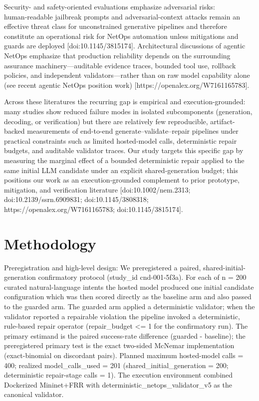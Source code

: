 \documentclass[conference]{IEEEtran}
\begin{document}
Security- and safety-oriented evaluations emphasize adversarial risks: human‑readable jailbreak prompts and adversarial-context attacks remain an effective threat class for unconstrained generative pipelines and therefore constitute an operational risk for NetOps automation unless mitigations and guards are deployed [doi:10.1145/3815174]. Architectural discussions of agentic NetOps emphasize that production reliability depends on the surrounding assurance machinery---auditable evidence traces, bounded tool use, rollback policies, and independent validators---rather than on raw model capability alone (see recent agentic NetOps position work) [https://openalex.org/W7161165783].

Across these literatures the recurring gap is empirical and execution-grounded: many studies show reduced failure modes in isolated subcomponents (generation, decoding, or verification) but there are relatively few reproducible, artifact-backed measurements of end-to-end generate--validate--repair pipelines under practical constraints such as limited hosted-model calls, deterministic repair budgets, and auditable validator traces. Our study targets this specific gap by measuring the marginal effect of a bounded deterministic repair applied to the same initial LLM candidate under an explicit shared-generation budget; this positions our work as an execution-grounded complement to prior prototype, mitigation, and verification literature [doi:10.1002/nem.2313; doi:10.2139/ssrn.6909831; doi:10.1145/3808318; https://openalex.org/W7161165783; doi:10.1145/3815174].

\section{Methodology}
Preregistration and high-level design: We preregistered a paired, shared-initial-generation confirmatory protocol (study\_id cnd-001-5f3a). For each of n = 200 curated natural-language intents the hosted model produced one initial candidate configuration which was then scored directly as the baseline arm and also passed to the guarded arm. The guarded arm applied a deterministic validator; when the validator reported a repairable violation the pipeline invoked a deterministic, rule-based repair operator (repair\_budget <= 1 for the confirmatory run). The primary estimand is the paired success-rate difference (guarded - baseline); the preregistered primary test is the exact two-sided McNemar implementation (exact-binomial on discordant pairs). Planned maximum hosted-model calls = 400; realized model\_calls\_used = 201 (shared\_initial\_generation = 200; deterministic repair-stage calls = 1). The execution environment combined Dockerized Mininet+FRR with deterministic\_netops\_validator\_v5 as the canonical validator.
\end{document}
